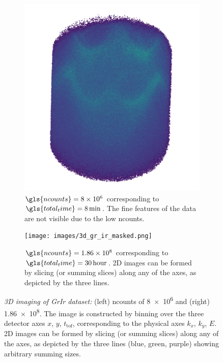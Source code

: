 \begin{figure}
    \centering
    \begin{subfigure}[t]{0.49\linewidth}
        \centering
        \includegraphics[width=1\linewidth]{images/3d_gr_ir_8M.png}
        \caption{$\gls{ncounts}=\num{8e6}$ corresponding to $\gls{total_time}=\qty{8}{min}$. The fine features of the data are not visible due to the low \gls{ncounts}.}
        \label{fig:3d-gr-ir-8M}
    \end{subfigure}
    \hfill
    \begin{subfigure}[t]{0.49\linewidth}
        \centering
        \texttt{[image: images/3d\_gr\_ir\_masked.png]}
        \caption{$\gls{ncounts}=\num{1.86e8}$ corresponding to $\gls{total_time}=\qty{30}{hour}$. 2D images can be formed by slicing (or summing slices) along any of the axes, as depicted by the three lines.}
        \label{fig:3d-gr-ir-186M}
    \end{subfigure}
    \caption{\textit{3D imaging of GrIr dataset:} (left) \gls{ncounts} of \num{8e6} and (right) \num{1.86e8}. The image is constructed by binning over the three detector axes $x$, $y$, $t_{\text{tof}}$, corresponding to the physical axes $k_x$, $k_y$, $E$. 2D images can be formed by slicing (or summing slices) along any of the axes, as depicted by the three lines (blue, green, purple) showing arbitrary summing sizes.}
    \label{fig:3d-gr-ir}
\end{figure}

